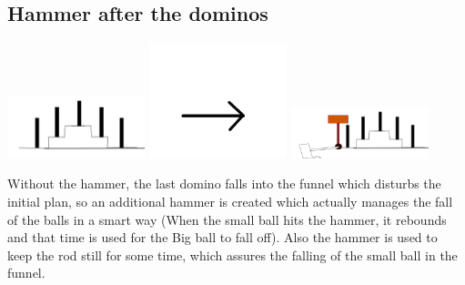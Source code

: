 \documentclass[11pt]{article}
\begin{document}
\subsection{Hammer after the dominos}
\begin{center}
 \includegraphics[width=0.3\textwidth,keepaspectratio]{img/dominos.png}
 \includegraphics[width=0.3\textwidth,keepaspectratio]{img/arrow.png}
 \includegraphics[width=0.3\textwidth,keepaspectratio]{img/dominos_with_hammer.png}
\end{center}
Without the hammer, the last domino falls into the funnel which disturbs the initial plan,
so an additional hammer is created which actually manages the fall of the balls in a smart way
(When the small ball hits the hammer, it rebounds and that time is used for the Big ball to fall off).
Also the hammer is used to keep the rod still for some time, which assures the falling of the small ball in the funnel.
\end{document}
